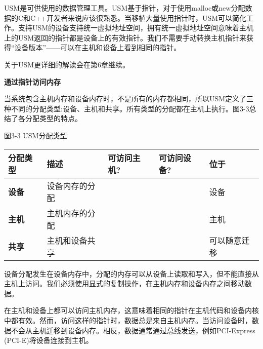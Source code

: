 USM是可供使用的数据管理工具。USM基于指针，对于使用malloc或new分配数据的C和C++开发者来说应该很熟悉。当移植大量使用指针时，USM可以简化工作。支持USM的设备支持统一虚拟地址空间，拥有统一虚拟地址空间意味着主机上的USM返回的指针都是设备上的有效指针。我们不需要手动转换主机指针来获得“设备版本”——可以在主机和设备上看到相同的指针。\par

关于USM更详细的解读会在第6章继续。\par

\hspace*{\fill} \par %
\textbf{通过指针访问内存}

当系统包含主机内存和设备内存时，不是所有的内存都相同，所以USM定义了三种不同的分配类型:设备、主机和共享。所有类型的分配都在主机上执行。图3-3总结了各分配类型的特点。\par

\hspace*{\fill} \par %
图3-3 USM分配类型
\begin{table}[H]
	\begin{tabular}{|l|l|l|l|l|}
		\hline
		\textbf{分配类型} & \textbf{描述}                       & \textbf{可访问主机?} & \textbf{可访问设备?} & \textbf{位于}        \\ \hline
		\textbf{设备}          & 设备内存的分配               & \XSolidBrush                       & \Checkmark                              & 设备                     \\ \hline
		\textbf{主机}            & 主机内存的分配                & \Checkmark                            & \Checkmark                               & 主机                       \\ \hline
		\textbf{共享}          & 主机和设备共享 & \Checkmark                            & \Checkmark                               & 可以随意迁移 \\ \hline
	\end{tabular}
\end{table}

设备分配发生在设备内存中，分配的内存可以从设备上读取和写入，但不能直接从主机上访问。我们必须使用显式的复制操作，在主机内存和设备内存之间移动数据。\par

在主机和设备上都可以访问主机内存，这意味着相同的指针在主机代码和设备内核中都有效。然而，访问这样的指针时，数据总是来自主机内存。当访问设备时，数据不会从主机迁移到设备内存。相反，数据通常通过总线发送，例如PCI-Express (PCI-E)将设备连接到主机。\par

